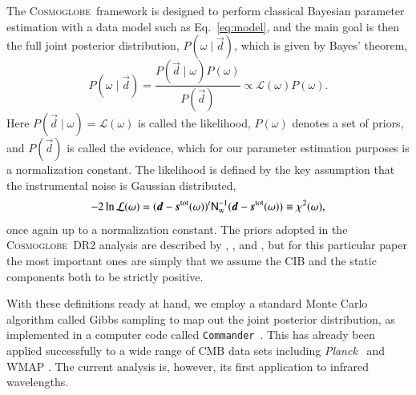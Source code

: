\documentclass{aa}
\def\commander{\texttt{Commander}}
\def\Planck{\textit{Planck}}
\newcommand{\dv}[0]{\vec{d}}
\newcommand{\s}[0]{\vec{s}}
\newcommand{\N}[0]{\tens{N}}
\newcommand{\cosmoglobe}{\textsc{Cosmoglobe}}
\begin{document}
The \cosmoglobe\ framework is designed to perform classical Bayesian
parameter estimation with a data model such as Eq.~\eqref{eq:model},
and the main goal is then the full joint posterior distribution,
$P(\omega\mid\dv)$, which is given by Bayes' theorem,
\begin{equation}
P(\omega\mid\dv) = \frac{P(\dv\mid\omega) P(\omega)}{P(\dv)} \propto
\mathcal{L}(\omega) P(\omega).
\end{equation}
Here $P(\dv\mid\omega) = \mathcal{L}(\omega)$ is called the likelihood,
$P(\omega)$ denotes a set of priors, and $P(\dv)$ is called the evidence,
which for our parameter estimation purposes is a 
normalization constant. The likelihood is defined by the key assumption that
the instrumental noise is Gaussian distributed,
\begin{equation}
-2\ln\mathcal{L}(\omega) = (\dv-\s^{\mathrm{tot}}(\omega))^t
  \N_{\mathrm{w}}^{-1}(\dv-\s^{\mathrm{tot}}(\omega)) \equiv \chi^2(\omega),
\end{equation}
once again up to a normalization constant. The priors
adopted in the \cosmoglobe\ DR2 analysis are described by
\citet{CG02_01}, \citet{CG02_02}, and \citet{CG02_04}, but for this particular paper the
most important ones are simply that we assume the CIB and the
static components both to be strictly positive. 

With these definitions ready at hand, we employ a standard Monte Carlo
algorithm called Gibbs sampling \citep[e.g.,][]{geman:1984} to map out
the joint posterior distribution, as implemented in a computer code
called \commander\ \citep{eriksen:2004,seljebotn:2019,bp03}. This has
already been applied successfully to a wide range of CMB data sets
including \Planck\ \citep{planck2014-a12,bp01} and WMAP
\citep{watts2023_dr1}. The current analysis is, however, its first
application to infrared wavelengths.
\end{document}
